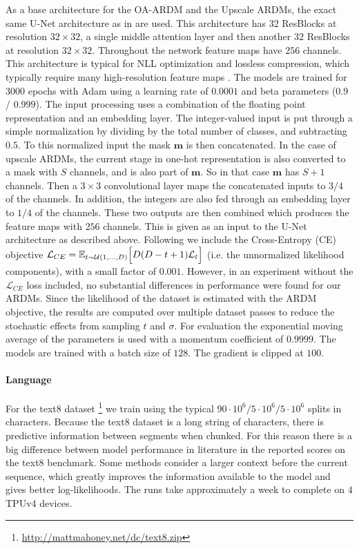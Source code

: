 \documentclass{article} \usepackage{iclr2022_conference,times}
\def\vm{{\bm{m}}}
\begin{document}
As a base architecture for the OA-ARDM and the Upscale ARDMs, the exact same U-Net architecture as in \citep{kingma2021vdm} are used. This architecture has $32$ ResBlocks at resolution $32 \times 32$, a single middle attention layer and then another $32$ ResBlocks at resolution $32 \times 32$. Throughout the network feature maps have $256$ channels. This architecture is typical for NLL optimization and lossless compression, which typically require many high-resolution feature maps \citep{mentzer2019practicallossless}. The models are trained for $3000$ epochs with Adam using a learning rate of $0.0001$ and beta parameters ($0.9$ / $0.999$). The input processing uses a combination of the floating point representation and an embedding layer. The integer-valued input is put through a simple normalization by dividing by the total number of classes, and subtracting $0.5$. To this normalized input the mask $\vm$ is then concatenated. In the case of upscale ARDMs, the current stage in one-hot representation is also converted to a mask with $S$ channels, and is also part of $\vm$. So in that case $\vm$ has $S+1$ channels. Then a $3 \times 3$ convolutional layer maps the concatenated inputs to $3/4$ of the channels. In addition, the integers are also fed through an embedding layer to $1/4$ of the channels. These two outputs are then combined which produces the feature maps with $256$ channels. This is given as an input to the U-Net architecture as described above. Following \citet{austin2021structured} we include the Cross-Entropy (CE) objective $\mathcal{L}_{CE} = \mathbb{E}_{t \sim \mathcal{U}(1, \ldots, D)} \Big{[} D (D - t + 1) \mathcal{L}_t \Big{]}$ (i.e. the unnormalized likelihood components), with a small factor of $0.001$. However, in an experiment without the $\mathcal{L}_{CE}$ loss included, no substantial differences in performance were found for our ARDMs. Since the likelihood of the dataset is estimated with the ARDM objective, the results are computed over multiple dataset passes to reduce the stochastic effects from sampling $t$ and $\sigma$. For evaluation the exponential moving average of the parameters is used with a momentum coefficient of $0.9999$. The models are trained with a batch size of $128$. The gradient is clipped at $100$.


\paragraph{Language}
For the text8 dataset \citep{mahoney2011large}\footnote{\href{http://mattmahoney.net/dc/text8.zip}{
http://mattmahoney.net/dc/text8.zip}} we train using the typical $90 \cdot 10^6 / 5 \cdot 10^6 / 5 \cdot 10^6$ splits in characters. Because the text8 dataset is a long string of characters, there is predictive information between segments when chunked. For this reason there is a big difference between model performance in literature in the reported scores on the text8 benchmark. Some methods consider a larger context before the current sequence, which greatly improves the information available to the model and gives better log-likelihoods. The runs take approximately a week to complete on $4$ TPUv4 devices.
\end{document}
